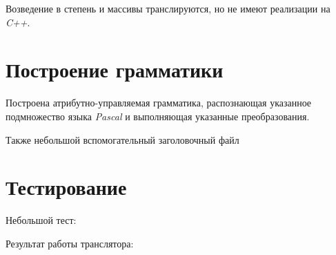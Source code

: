 \documentclass[11pt,a4paper,oneside]{report}
\begin{document}
Возведение в степень и массивы транслируются, но не имеют реализации на \emph{C++}.

\section{Построение грамматики}

Построена атрибутно-управляемая грамматика, распознающая указанное подмножество языка \emph{Pascal}
и выполняющая указанные преобразования.



Также небольшой вспомогательный заголовочный файл



\section{Тестирование}

Небольшой тест:



Результат работы транслятора:


\end{document}
